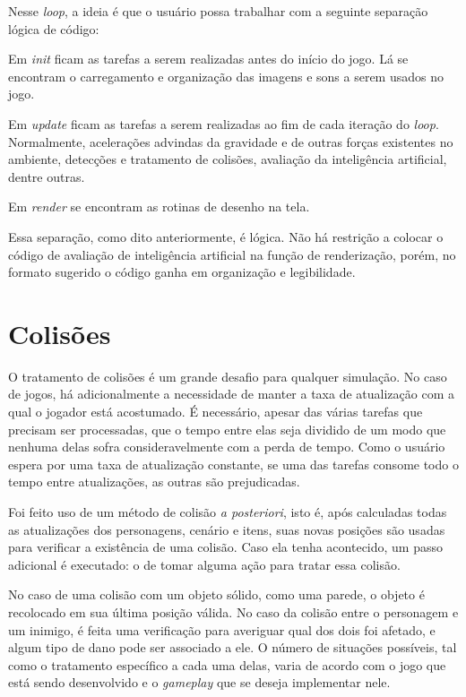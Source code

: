 \documentclass[brazil]{abnt}
\begin{document}


Nesse \textit{loop}, a ideia é que o usuário possa trabalhar com a seguinte separação lógica de código:

Em \textit{init} ficam as tarefas a serem realizadas antes do início do jogo. Lá se encontram o carregamento e organização das imagens e sons a serem usados no jogo.

Em \textit{update} ficam as tarefas a serem realizadas ao fim de cada iteração do \textit{loop}. Normalmente, acelerações advindas da gravidade e de outras forças existentes no ambiente, detecções e tratamento de colisões, avaliação da inteligência artificial, dentre outras.

Em \textit{render} se encontram as rotinas de desenho na tela.

Essa separação, como dito anteriormente, é lógica. Não há restrição a colocar o código de avaliação de inteligência artificial na função de renderização, porém, no formato sugerido o código ganha em organização e legibilidade.

\section{Colisões}

O tratamento de colisões é um grande desafio para qualquer simulação. No caso de jogos, há adicionalmente a necessidade de manter a taxa de atualização com a qual o jogador está acostumado. É necessário, apesar das várias tarefas que precisam ser processadas, que o tempo entre elas seja dividido de um modo que nenhuma delas sofra consideravelmente com a perda de tempo. Como o usuário espera por uma taxa de atualização constante, se uma das tarefas consome todo o tempo entre atualizações, as outras são prejudicadas.

Foi feito uso de um método de colisão \textit{a posteriori}, isto é, após calculadas todas as atualizações dos personagens, cenário e itens, suas novas posições são usadas para verificar a existência de uma colisão. Caso ela tenha acontecido, um passo adicional é executado: o de tomar alguma ação para tratar essa colisão.

No caso de uma colisão com um objeto sólido, como uma parede,  o objeto é recolocado em sua última posição válida. No caso da colisão entre o personagem e um inimigo, é feita uma verificação para averiguar qual dos dois foi afetado, e algum tipo de dano pode ser associado a ele. O número de situações possíveis, tal como o tratamento específico a cada uma delas, varia de acordo com o jogo que está sendo desenvolvido e o \textit{gameplay} que se deseja implementar nele.
\end{document}
